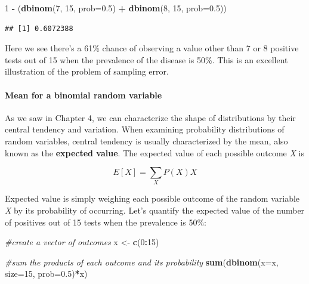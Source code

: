 \documentclass[
]{book}
\newenvironment{Shaded}{\begin{snugshade}}{\end{snugshade}}
\newcommand{\AttributeTok}[1]{\textcolor[rgb]{0.13,0.29,0.53}{#1}}
\newcommand{\CommentTok}[1]{\textcolor[rgb]{0.56,0.35,0.01}{\textit{#1}}}
\newcommand{\DecValTok}[1]{\textcolor[rgb]{0.00,0.00,0.81}{#1}}
\newcommand{\FloatTok}[1]{\textcolor[rgb]{0.00,0.00,0.81}{#1}}
\newcommand{\FunctionTok}[1]{\textcolor[rgb]{0.13,0.29,0.53}{\textbf{#1}}}
\newcommand{\NormalTok}[1]{#1}
\newcommand{\OtherTok}[1]{\textcolor[rgb]{0.56,0.35,0.01}{#1}}
\newcommand{\SpecialCharTok}[1]{\textcolor[rgb]{0.81,0.36,0.00}{\textbf{#1}}}
\begin{document}
\begin{Shaded}
\begin{Highlighting}[]
\DecValTok{1} \SpecialCharTok{{-}}\NormalTok{ (}\FunctionTok{dbinom}\NormalTok{(}\DecValTok{7}\NormalTok{, }\DecValTok{15}\NormalTok{, }\AttributeTok{prob=}\FloatTok{0.5}\NormalTok{) }\SpecialCharTok{+} \FunctionTok{dbinom}\NormalTok{(}\DecValTok{8}\NormalTok{, }\DecValTok{15}\NormalTok{, }\AttributeTok{prob=}\FloatTok{0.5}\NormalTok{))}
\end{Highlighting}
\end{Shaded}

\begin{verbatim}
## [1] 0.6072388
\end{verbatim}

Here we see there's a 61\% chance of observing a value other than 7 or 8 positive tests out of 15 when the prevalence of the disease is 50\%. This is an excellent illustration of the problem of sampling error.

\paragraph{Mean for a binomial random variable}\label{mean-for-a-binomial-random-variable}

As we saw in Chapter 4, we can characterize the shape of distributions by their central tendency and variation. When examining probability distributions of random variables, central tendency is usually characterized by the mean, also known as the \textbf{expected value}. The expected value of each possible outcome \emph{X} is

\[
E[X] = \sum_{X}P(X)X
\]

Expected value is simply weighing each possible outcome of the random variable \emph{X} by its probability of occurring. Let's quantify the expected value of the number of positives out of 15 tests when the prevalence is 50\%:

\begin{Shaded}
\begin{Highlighting}[]
\CommentTok{\#create a vector of outcomes}
\NormalTok{x }\OtherTok{\textless{}{-}} \FunctionTok{c}\NormalTok{(}\DecValTok{0}\SpecialCharTok{:}\DecValTok{15}\NormalTok{)}

\CommentTok{\#sum the products of each outcome and its probability}
\FunctionTok{sum}\NormalTok{(}\FunctionTok{dbinom}\NormalTok{(}\AttributeTok{x=}\NormalTok{x, }\AttributeTok{size=}\DecValTok{15}\NormalTok{, }\AttributeTok{prob=}\FloatTok{0.5}\NormalTok{)}\SpecialCharTok{*}\NormalTok{x)}
\end{Highlighting}
\end{Shaded}
\end{document}
